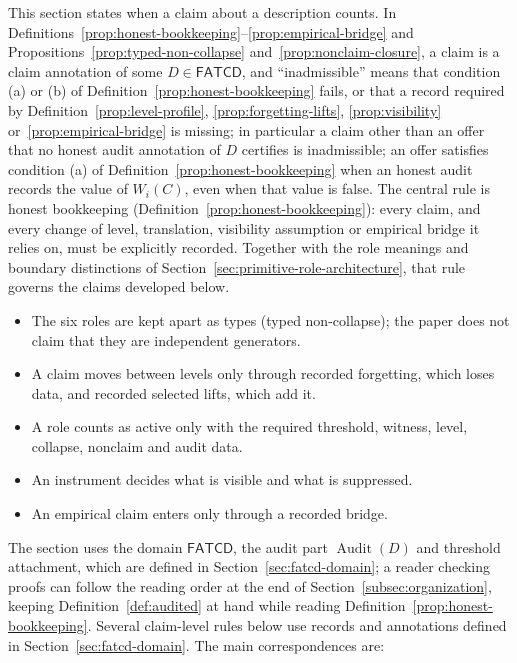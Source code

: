 \documentclass[11pt]{article}
\theoremstyle{definition}
\newcommand{\FATCD}{\ensuremath{\mathsf{FATCD}}}
\newcommand{\Audit}[1]{\ensuremath{\operatorname{Audit}\!\left(#1\right)}}
\begin{document}
This section states when a claim about a description counts. In
Definitions~\ref{prop:honest-bookkeeping}--\ref{prop:empirical-bridge} and
Propositions~\ref{prop:typed-non-collapse} and~\ref{prop:nonclaim-closure}, a
claim is a claim annotation of some \(D\in\FATCD{}\), and ``inadmissible''
means that condition (a) or (b) of Definition~\ref{prop:honest-bookkeeping}
fails, or that a record required by Definition~\ref{prop:level-profile},
\ref{prop:forgetting-lifts}, \ref{prop:visibility} or~\ref{prop:empirical-bridge}
is missing; in particular a claim other than an offer that no honest audit annotation of
\(D\) certifies is inadmissible; an offer satisfies condition (a) of Definition~\ref{prop:honest-bookkeeping} when an honest audit
records the value of \(W_i(C)\), even when that value is false. The central
rule is honest bookkeeping (Definition~\ref{prop:honest-bookkeeping}):
every claim, and every change of level, translation, visibility
assumption or empirical bridge it relies on, must be explicitly
recorded. Together with the role meanings and boundary distinctions of
Section~\ref{sec:primitive-role-architecture}, that rule governs the
claims developed below.
\begin{itemize}[topsep=2pt,itemsep=1pt]
  \item The six roles are kept apart as types (typed non-collapse); the
    paper does not claim that they are independent generators.
  \item A claim moves between levels only through recorded forgetting,
    which loses data, and recorded selected lifts, which add it.
  \item A role counts as active only with the required threshold,
    witness, level, collapse, nonclaim and audit data.
  \item An instrument decides what is visible and what is suppressed.
  \item An empirical claim enters only through a recorded bridge.
\end{itemize}
The section uses the domain \FATCD{}, the audit part \(\Audit{D}\) and
threshold attachment, which are defined in
Section~\ref{sec:fatcd-domain}; a reader checking proofs can follow the reading order at the end of
Section~\ref{subsec:organization}, keeping Definition~\ref{def:audited} at
hand while reading Definition~\ref{prop:honest-bookkeeping}. Several claim-level rules
below use records and annotations defined in
Section~\ref{sec:fatcd-domain}. The main correspondences are:
\end{document}
